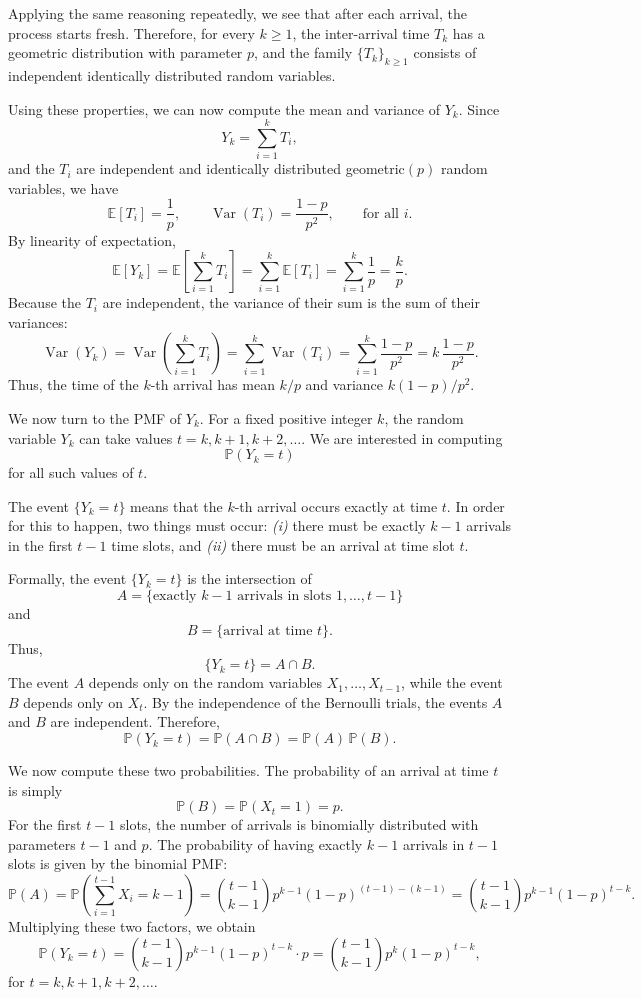 Applying the same reasoning repeatedly, we see that after each arrival, the process starts fresh.  
Therefore, for every \(k \geq 1\), the inter-arrival time \(T_k\) has a geometric distribution with parameter \(p\), and the family \(\{T_k\}_{k \geq 1}\) consists of independent identically distributed random variables.  

Using these properties, we can now compute the mean and variance of \(Y_k\).  
Since
\[
Y_k = \sum_{i=1}^{k} T_i,
\]
and the \(T_i\) are independent and identically distributed geometric\((p)\) random variables, we have
\[
\mathbb{E}[T_i] = \frac{1}{p},
\qquad
\operatorname{Var}(T_i) = \frac{1-p}{p^{2}},
\qquad
\text{for all } i.
\]
By linearity of expectation,
\[
\mathbb{E}[Y_k]
=
\mathbb{E}\left[\sum_{i=1}^{k} T_i\right]
=
\sum_{i=1}^{k} \mathbb{E}[T_i]
=
\sum_{i=1}^{k} \frac{1}{p}
=
\frac{k}{p}.
\]
Because the \(T_i\) are independent, the variance of their sum is the sum of their variances:
\[
\operatorname{Var}(Y_k)
=
\operatorname{Var}\left(\sum_{i=1}^{k} T_i\right)
=
\sum_{i=1}^{k} \operatorname{Var}(T_i)
=
\sum_{i=1}^{k} \frac{1-p}{p^{2}}
=
k\,\frac{1-p}{p^{2}}.
\]
Thus, the time of the \(k\)-th arrival has mean \(k/p\) and variance \(k(1-p)/p^{2}\).  

We now turn to the PMF of \(Y_k\).  
For a fixed positive integer \(k\), the random variable \(Y_k\) can take values \(t = k, k+1, k+2,\ldots\).  
We are interested in computing
\[
\mathbb{P}(Y_k = t)
\]
for all such values of \(t\).  

The event \(\{Y_k = t\}\) means that the \(k\)-th arrival occurs exactly at time \(t\).  
In order for this to happen, two things must occur:  
\textit{(i)} there must be exactly \(k-1\) arrivals in the first \(t-1\) time slots, and  
\textit{(ii)} there must be an arrival at time slot \(t\).  

Formally, the event \(\{Y_k = t\}\) is the intersection of  
\[
A = \{\text{exactly } k-1 \text{ arrivals in slots } 1,\ldots,t-1\}
\]
and
\[
B = \{\text{arrival at time } t\}.
\]
Thus,
\[
\{Y_k = t\} = A \cap B.
\]
The event \(A\) depends only on the random variables \(X_1,\ldots,X_{t-1}\), while the event \(B\) depends only on \(X_t\).  
By the independence of the Bernoulli trials, the events \(A\) and \(B\) are independent.  
Therefore,
\[
\mathbb{P}(Y_k = t)
=
\mathbb{P}(A \cap B)
=
\mathbb{P}(A)\,\mathbb{P}(B).
\]

We now compute these two probabilities.  
The probability of an arrival at time \(t\) is simply
\[
\mathbb{P}(B) = \mathbb{P}(X_t = 1) = p.
\]
For the first \(t-1\) slots, the number of arrivals is binomially distributed with parameters \(t-1\) and \(p\).  
The probability of having exactly \(k-1\) arrivals in \(t-1\) slots is given by the binomial PMF:
\[
\mathbb{P}(A)
=
\mathbb{P}\left(\sum_{i=1}^{t-1} X_i = k-1\right)
=
\binom{t-1}{k-1} p^{k-1} (1-p)^{(t-1)-(k-1)}
=
\binom{t-1}{k-1} p^{k-1} (1-p)^{t-k}.
\]
Multiplying these two factors, we obtain
\[
\mathbb{P}(Y_k = t)
=
\binom{t-1}{k-1} p^{k-1} (1-p)^{t-k} \cdot p
=
\binom{t-1}{k-1} p^{k} (1-p)^{t-k},
\]
for \(t = k, k+1, k+2,\ldots\).  


